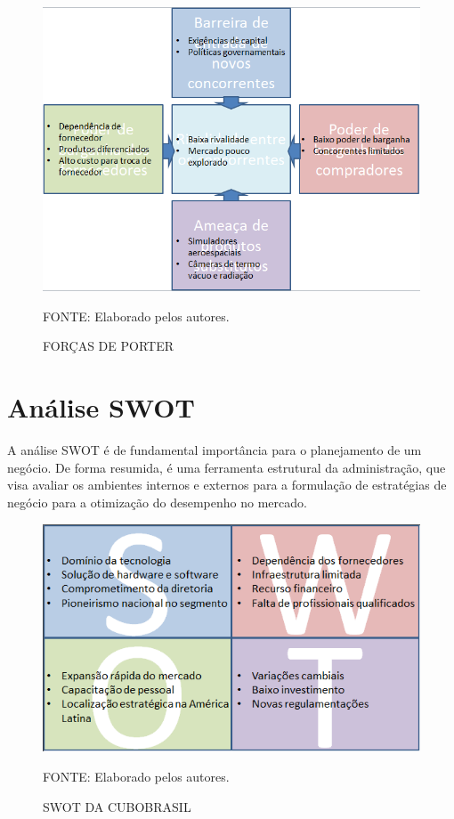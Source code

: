 \documentclass[
	12pt,				%
	openright,			%
	oneside,			%
	a4paper,			%
	english,			%
	french,				%
	spanish,			%
	brazil				%
	]{abntex2}
\begin{document}
	\begin{figure}[th]
		\caption{FORÇAS DE PORTER}
		\centering
		\includegraphics[width=1.0\linewidth]{./figs/PORTER}
		
		\begin{small}
			FONTE: Elaborado pelos autores.
		\end{small}
	\end{figure}

\section[Análise SWOT]{Análise SWOT}

	A análise SWOT é de fundamental importância para o planejamento de um negócio. De forma resumida, é uma ferramenta estrutural da administração, que visa avaliar os ambientes internos e externos para a formulação de estratégias de negócio para a otimização do desempenho no mercado.
	
	\begin{figure}[th]
		\caption{SWOT DA CUBOBRASIL}
		\centering
		\includegraphics[width=1.0\linewidth]{./figs/SWOT}
		
		\begin{small}
			FONTE: Elaborado pelos autores.
		\end{small}
	\end{figure}	
	\pagebreak
\end{document}
